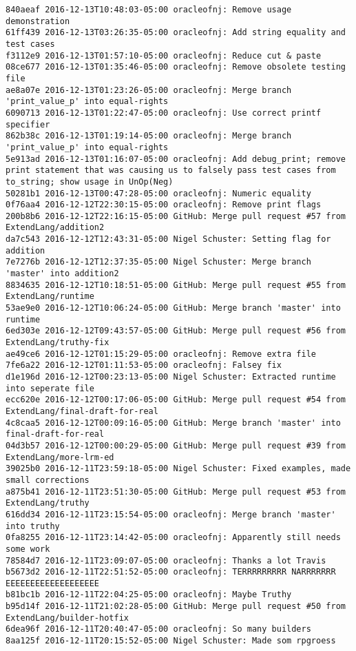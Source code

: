 \begin{lstlisting}
840aeaf 2016-12-13T10:48:03-05:00 oracleofnj: Remove usage demonstration
61ff439 2016-12-13T03:26:35-05:00 oracleofnj: Add string equality and test cases
f3112e9 2016-12-13T01:57:10-05:00 oracleofnj: Reduce cut & paste
08ce677 2016-12-13T01:35:46-05:00 oracleofnj: Remove obsolete testing file
ae8a07e 2016-12-13T01:23:26-05:00 oracleofnj: Merge branch 'print_value_p' into equal-rights
6090713 2016-12-13T01:22:47-05:00 oracleofnj: Use correct printf specifier
862b38c 2016-12-13T01:19:14-05:00 oracleofnj: Merge branch 'print_value_p' into equal-rights
5e913ad 2016-12-13T01:16:07-05:00 oracleofnj: Add debug_print; remove print statement that was causing us to falsely pass test cases from to_string; show usage in UnOp(Neg)
50281b1 2016-12-13T00:47:28-05:00 oracleofnj: Numeric equality
0f76aa4 2016-12-12T22:30:15-05:00 oracleofnj: Remove print flags
200b8b6 2016-12-12T22:16:15-05:00 GitHub: Merge pull request #57 from ExtendLang/addition2
da7c543 2016-12-12T12:43:31-05:00 Nigel Schuster: Setting flag for addition
7e7276b 2016-12-12T12:37:35-05:00 Nigel Schuster: Merge branch 'master' into addition2
8834635 2016-12-12T10:18:51-05:00 GitHub: Merge pull request #55 from ExtendLang/runtime
53ae9e0 2016-12-12T10:06:24-05:00 GitHub: Merge branch 'master' into runtime
6ed303e 2016-12-12T09:43:57-05:00 GitHub: Merge pull request #56 from ExtendLang/truthy-fix
ae49ce6 2016-12-12T01:15:29-05:00 oracleofnj: Remove extra file
7fe6a22 2016-12-12T01:11:53-05:00 oracleofnj: Falsey fix
d1e196d 2016-12-12T00:23:13-05:00 Nigel Schuster: Extracted runtime into seperate file
ecc620e 2016-12-12T00:17:06-05:00 GitHub: Merge pull request #54 from ExtendLang/final-draft-for-real
4c8caa5 2016-12-12T00:09:16-05:00 GitHub: Merge branch 'master' into final-draft-for-real
04d3b57 2016-12-12T00:00:29-05:00 GitHub: Merge pull request #39 from ExtendLang/more-lrm-ed
39025b0 2016-12-11T23:59:18-05:00 Nigel Schuster: Fixed examples, made small corrections
a875b41 2016-12-11T23:51:30-05:00 GitHub: Merge pull request #53 from ExtendLang/truthy
616dd34 2016-12-11T23:15:54-05:00 oracleofnj: Merge branch 'master' into truthy
0fa8255 2016-12-11T23:14:42-05:00 oracleofnj: Apparently still needs some work
78584d7 2016-12-11T23:09:07-05:00 oracleofnj: Thanks a lot Travis
b5673d2 2016-12-11T22:51:52-05:00 oracleofnj: TERRRRRRRRR NARRRRRRR EEEEEEEEEEEEEEEEEEE
b81bc1b 2016-12-11T22:04:25-05:00 oracleofnj: Maybe Truthy
b95d14f 2016-12-11T21:02:28-05:00 GitHub: Merge pull request #50 from ExtendLang/builder-hotfix
6dea96f 2016-12-11T20:40:47-05:00 oracleofnj: So many builders
8aa125f 2016-12-11T20:15:52-05:00 Nigel Schuster: Made som rpgroess

\end{lstlisting}
